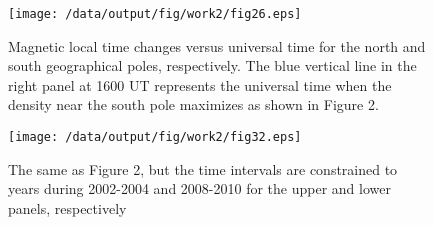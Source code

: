 \documentclass[draft,grl]{/home/gdj/文档/template/agu_template/AGUTeX}
\begin{document}
\begin{figure}
    \centering
    \noindent\texttt{[image: /data/output/fig/work2/fig26.eps]}
    \caption{ Magnetic local time changes versus universal time for the north and south geographical poles, 
    respectively. The blue vertical line in the right panel at 1600 UT represents the universal time when 
    the density near the south pole maximizes as shown in Figure 2.}
    \label{figure3}
\end{figure}
\begin{figure}
    \centering
    \noindent\texttt{[image: /data/output/fig/work2/fig32.eps]}
    \caption{The same as Figure 2, but the time intervals are constrained to years during 2002-2004 
    and 2008-2010 for the upper and lower panels, respectively}
    \label{figure4}
\end{figure}

\end{document}

